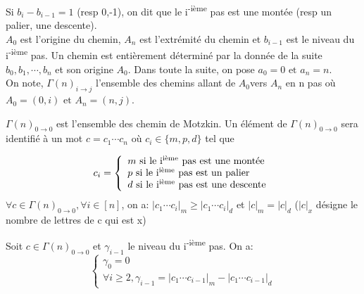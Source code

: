 		Si $b_{i}-b_{i-1}=1$ (resp 0,-1), on dit que le i\textsuperscript{-ième } pas est une montée
		(resp un palier, une descente).\\
		$A_{0}$ est l'origine du chemin, $A_{n}$ est l'extrémité du chemin et $b_{i-1}$ est le niveau du i\textsuperscript{-ième} pas. Un chemin est entièrement déterminé par la donnée de la suite $b_{0},b_{1},\cdots,b_{n}$ et son origine $A_{0}$. 
		Dans toute la suite, on pose $ a_{0} = 0 \text{ et } a_{n} = n$.\\
		On note, ${\Gamma(n)}_{i\longrightarrow j}$ l'ensemble des chemins allant de $ A_{0} $vers $ A_{n} $ en n pas où \\
		$ A_{0}=(0,i) \text{ et } A_{n}=(n,j)$.
		\begin{definition}
			\begin{rm}
				${\Gamma(n)}_{0 \longrightarrow 0}$ est l'ensemble des chemin de Motzkin. Un élément de ${\Gamma(n)}_{0\longrightarrow 0}$ sera identifié à un mot $c=c_{1}\cdots c_{n}$ où $c_{i}\in\{m,p,d\}$ tel que 

		\[
		c_{i}=\left \{ \begin{array}{l}
		m \text{ si le i\textsuperscript{ième} pas est une montée}\\
		p \text{ si le  i\textsuperscript{ième} pas est un palier}\\
		d \text{ si le i\textsuperscript{ième} pas est une descente}
		\end{array}
		\right.
		\]
		$\forall c\in {\Gamma(n)}_{0 \longrightarrow 0}, \forall i\in[n]$, on a:
		$|c_{1}\cdots c_{i}|_m\geq|c_{1}\cdots c_{i}|_d$ et $|c|_{m}=|c|_{d}$ ($ |c|_{x}$ désigne le nombre de lettres de  c qui est x)
			\end{rm}
		\end{definition}

		\begin{proposition}
			\begin{rm}
				Soit $c\in {\Gamma(n)}_{0 \longrightarrow 0}$ et $\gamma_{i-1}$ 
				le niveau du i\textsuperscript{-ième} pas. On a:
				\[
				\left \{
				\begin{array}{l}
				\gamma_{0}=0\\
				\forall i\geq2, \gamma_{i-1}=|c_{1}\cdots c_{i-1}|_m-|c_{1}\cdots c_{i-1}|_d
				\end{array}
				\right.
				\]
			\end{rm}
		\end{proposition}

